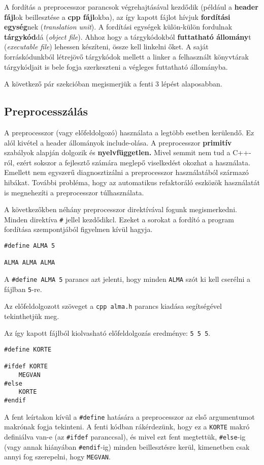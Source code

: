\documentclass[a4paper,11.5pt,table]{article}
\begin{document}
	A fordítás a preprocesszor parancsok végrehajtásával kezdődik (például a \textbf{header fájl}ok beillesztése a \textbf{cpp fájl}okba), az így kapott fájlot hívjuk \textbf{fordítási egység}nek (\textit{translation unit}). A fordítási egységek külön-külön fordulnak \textbf{tárgykód}dá (\textit{object file}). Ahhoz hogy a tárgykódokból \textbf{futtatható állomány}t (\textit{executable file}) lehessen készíteni, össze kell linkelni őket. A saját forráskódunkból létrejövő tárgykódok mellett a linker a felhasznált könyvtárak tárgykódjait is bele fogja szerkeszteni a végleges futtatható állományba.
	\medskip
	
	A következő pár szekcióban megismerjük a fenti 3 lépést alaposabban.
	
	\subsection{Preprocesszálás}
	A preprocesszor (vagy előfeldolgozó) használata a legtöbb esetben kerülendő. Ez alól kivétel a header állományok include-olása. A preprocesszor \textbf{primitív} szabályok alapján dolgozik és \textbf{nyelvfüggetlen.} Mivel semmit nem tud a C++-ról, ezért sokszor a fejlesztő számára meglepő viselkedést okozhat a használata. Emellett nem egyszerű diagnosztizálni a preprocesszor használatából származó hibákat. További probléma, hogy az automatikus refaktoráló eszközök használatát is megnehezíti a preprocesszor túlhasználata.
	
	A következőkben néhány preprocesszor direktívával fogunk megismerkedni. Minden direktíva \texttt{\#} jellel kezdődikcl. Ezeket a sorokat a fordító a program fordítása szempontjából figyelmen kívül hagyja.
  \bigskip
	
	\begin{lstlisting}
#define ALMA 5

ALMA ALMA ALMA
	\end{lstlisting}
	A \texttt{\#define ALMA 5}  parancs azt jelenti, hogy minden \texttt{ALMA} szót ki kell cserélni a fájlban \texttt{5}-re.
	
	Az előfeldolgozott szöveget a \texttt{cpp alma.h} parancs kiadása segítségével tekinthetjük meg.
	
	Az így kapott fájlból kiolvasható előfeldolgozás eredménye: \texttt{5 5 5}.
	\bigskip
	
	\begin{lstlisting}
#define KORTE

#ifdef KORTE
	MEGVAN
#else
	KORTE
#endif
	\end{lstlisting}
	A fent leírtakon kívül a \texttt{\#define} hatására a preprocesszor az első argumentumot makrónak fogja tekinteni. A fenti kódban rákérdezünk, hogy ez a \texttt{KORTE} makró definiálva van-e (az \texttt{\#ifdef} paranccsal), és mivel ezt fent megtettük, \texttt{\#else}-ig (vagy annak hiányában \texttt{\#endif}-ig) minden beillesztésre kerül, kimenetben csak annyi fog szerepelni, hogy \texttt{MEGVAN}.
	\bigskip
	
\end{document}
